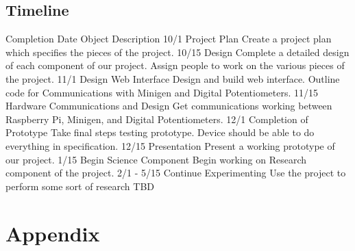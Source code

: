 \documentclass{article}	%
\begin{document}
\begin{multicols}{2}
\section{Timeline}






Completion Date
Object
Description
10/1
Project Plan
Create a project plan which specifies the pieces of the project.
10/15
Design
Complete a detailed design of each component of our project. Assign people to work on the various pieces of the project.
11/1
Design Web Interface
Design and build web interface. Outline code for Communications with Minigen and Digital Potentiometers.
11/15
Hardware Communications and Design
Get communications working between Raspberry Pi, Minigen, and Digital Potentiometers.
12/1
Completion of Prototype
Take final steps testing prototype. Device should be able to do everything in specification.
12/15
Presentation
Present a working prototype of our project.
1/15
Begin Science Component
Begin working on Research component of the project.
2/1 - 5/15
Continue Experimenting
Use the project to perform some sort of research TBD

\end{multicols}

\section{Appendix}
\end{document}
